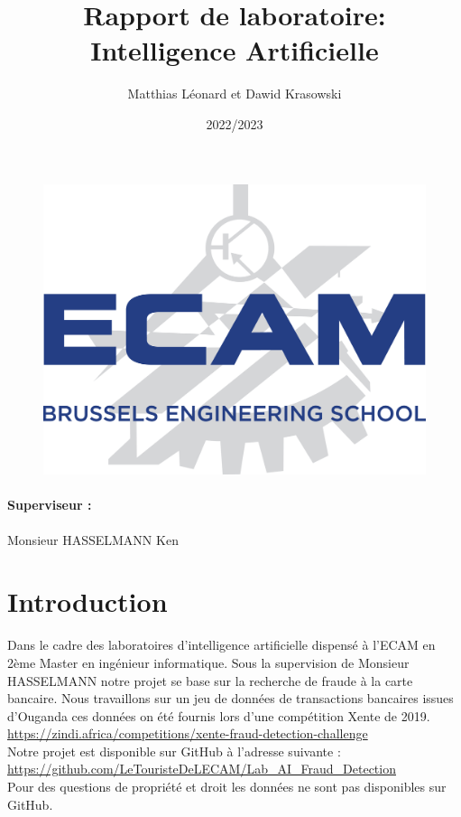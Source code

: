 \documentclass{article}
\title{Rapport de laboratoire: \\Intelligence Artificielle}
\author{Matthias Léonard et Dawid Krasowski}
\date{2022/2023}
\begin{document}
\maketitle

\begin{figure}[h]
    \centering
    \includegraphics[scale=0.15]{./images/Logo ECAM.png}

\end{figure}


\paragraph{Superviseur :} Monsieur HASSELMANN Ken



\pagebreak
\tableofcontents
\pagebreak
\section{Introduction}

    Dans le cadre des laboratoires d'intelligence artificielle dispensé à l'ECAM en 2ème Master en ingénieur informatique.
Sous la supervision de Monsieur HASSELMANN notre projet se base sur la recherche de fraude à la carte bancaire.
Nous travaillons sur un jeu de données de transactions bancaires issues d'Ouganda 
ces données on été fournis lors d'une compétition Xente de 2019.\\ \url{https://zindi.africa/competitions/xente-fraud-detection-challenge} \\

Notre projet est disponible sur GitHub à l'adresse suivante :\\ \url{https://github.com/LeTouristeDeLECAM/Lab_AI_Fraud_Detection} \\
Pour des questions de propriété et droit les données ne sont pas disponibles sur GitHub.
\end{document}
